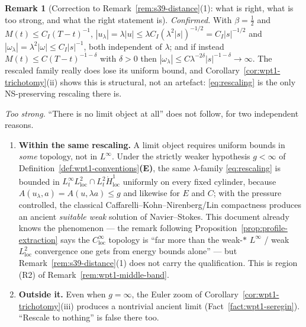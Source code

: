 \documentclass[11pt]{article}
\theoremstyle{definition}
\newtheorem{remark}[theorem]{Remark}
\theoremstyle{remark}
\begin{document}
\begin{remark}[Correction to Remark~\ref{rem:s39-distance}(1): what is right,
  what is too strong, and what the right statement is]
  \label{rem:wpt1-correction}
  \emph{Confirmed.} With $\beta=\tfrac12$ and $M(t)\leq C_I(T-t)^{-1}$,
  $|u_\lambda|=\lambda|u|\leq\lambda C_I(\lambda^2|s|)^{-1/2}=C_I|s|^{-1/2}$
  and $|\omega_\lambda|=\lambda^2|\omega|\leq C_I|s|^{-1}$, both independent
  of $\lambda$; and if instead $M(t)\leq C(T-t)^{-1-\delta}$ with $\delta>0$
  then $|\omega_\lambda|\leq C\lambda^{-2\delta}|s|^{-1-\delta}\to\infty$.
  The rescaled family really does lose its uniform bound, and
  Corollary~\ref{cor:wpt1-trichotomy}(ii) shows this is structural, not an
  artefact: \eqref{eq:rescaling} is the only NS-preserving rescaling there
  is.

  \emph{Too strong.} ``There is no limit object at all'' does not follow, for
  two independent reasons.
  \begin{enumerate}[label=(\alph*)]
    \item \textbf{Within the same rescaling.} A limit object requires uniform
      bounds in \emph{some} topology, not in $L^\infty$. Under the strictly
      weaker hypothesis $g<\infty$ of
      Definition~\ref{def:wpt1-conventions}\textbf{(E)}, the same
      $\lambda$-family \eqref{eq:rescaling} is bounded in
      $L^\infty_tL^2_{\mathrm{loc}}\cap L^2_t\dot H^1_{\mathrm{loc}}$
      uniformly on every fixed cylinder, because
      $A(u_\lambda,a)=A(u,\lambda a)\leq g$ and likewise for $E$ and $C$;
      with the pressure controlled, the classical
      Caffarelli--Kohn--Nirenberg/Lin compactness produces an ancient
      \emph{suitable weak} solution of Navier--Stokes. This document already
      knows the phenomenon --- the remark following
      Proposition~\ref{prop:profile-extraction} says the
      $C^\infty_{\mathrm{loc}}$ topology is ``far more than the weak-$*$
      $L^\infty$ / weak $L^2_{\mathrm{loc}}$ convergence one gets from energy
      bounds alone'' --- but Remark~\ref{rem:s39-distance}(1) does not carry
      the qualification. This is region (R2) of
      Remark~\ref{rem:wpt1-middle-band}.
    \item \textbf{Outside it.} Even when $g=\infty$, the Euler zoom of
      Corollary~\ref{cor:wpt1-trichotomy}(iii) produces a nontrivial ancient
      limit (Fact~\ref{fact:wpt1-seregin}). ``Rescale to nothing'' is false
      there too.
  \end{enumerate}


\end{remark}
\end{document}
